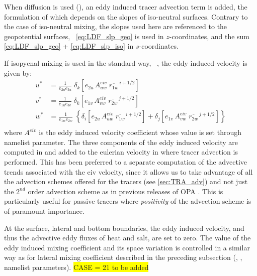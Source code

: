 \documentclass[../main/NEMO_manual]{subfiles}
\begin{document}
When  \citet{gent.mcwilliams_JPO90} diffusion is used (),
an eddy induced tracer advection term is added,
the formulation of which depends on the slopes of iso-neutral surfaces.
Contrary to the case of iso-neutral mixing, the slopes used here are referenced to the geopotential surfaces,
\ie\ \autoref{eq:LDF_slp_geo} is used in $z$-coordinates,
and the sum \autoref{eq:LDF_slp_geo} + \autoref{eq:LDF_slp_iso} in $s$-coordinates.

If isopycnal mixing is used in the standard way, \ie\ , the eddy induced velocity is given by:
\begin{equation}
  \label{eq:LDF_eiv}
  \begin{split}
    u^* & = \frac{1}{e_{2u}e_{3u}}\; \delta_k \left[e_{2u} \, A_{uw}^{eiv} \; \overline{r_{1w}}^{\,i+1/2} \right]\\
    v^* & = \frac{1}{e_{1u}e_{3v}}\; \delta_k \left[e_{1v} \, A_{vw}^{eiv} \; \overline{r_{2w}}^{\,j+1/2} \right]\\
    w^* & = \frac{1}{e_{1w}e_{2w}}\; \left\{ \delta_i \left[e_{2u} \, A_{uw}^{eiv} \; \overline{r_{1w}}^{\,i+1/2} \right] + \delta_j \left[e_{1v} \, A_{vw}^{eiv} \; \overline{r_{2w}}^{\,j+1/2} \right] \right\} \\
  \end{split}
\end{equation}
where $A^{eiv}$ is the eddy induced velocity coefficient whose value is set through   namelist parameter.
The three components of the eddy induced velocity are computed in  and
added to the eulerian velocity in  where tracer advection is performed.
This has been preferred to a separate computation of the advective trends associated with the eiv velocity,
since it allows us to take advantage of all the advection schemes offered for the tracers
(see \autoref{sec:TRA_adv}) and not just the $2^{nd}$ order advection scheme as in
previous releases of OPA \citep{madec.delecluse.ea_NPM98}.
This is particularly useful for passive tracers where \emph{positivity} of the advection scheme is of
paramount importance.

At the surface, lateral and bottom boundaries, the eddy induced velocity,
and thus the advective eddy fluxes of heat and salt, are set to zero.
The value of the eddy induced mixing coefficient and its space variation is controlled in a similar way as for lateral mixing coefficient described in the preceding subsection (, ,  namelist parameters).
\colorbox{yellow}{CASE  = 21 to be added}
\end{document}

